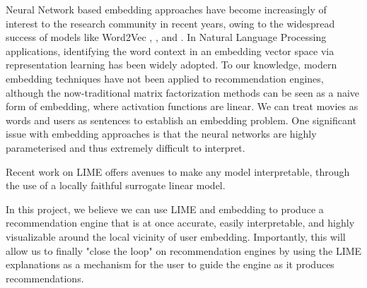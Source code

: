 Neural Network based embedding approaches have become increasingly of interest to the research community in recent years, owing to the widespread success of models like Word2Vec \cite{mikolov2013efficient}, \cite{rong2014word2vec}, and \cite{rong2014word2vec}. In Natural Language Processing applications, identifying the word context in an embedding vector space via representation learning has been widely adopted. To our knowledge, modern embedding techniques have not been applied to recommendation engines, although the now-traditional matrix factorization methods can be seen as a naive form of embedding, where activation functions are linear. We can treat movies as words and users as sentences to establish an embedding problem. One significant issue with embedding approaches is that the neural networks are highly parameterised and thus extremely difficult to interpret.

Recent work on LIME \cite{ribeiro2016model} \cite{ribeiro2016should} offers avenues to make any model interpretable, through the use of a locally faithful surrogate linear model. 

In this project, we believe we can use LIME and embedding to produce a recommendation engine that is at once accurate, easily interpretable, and highly visualizable around the local vicinity of user embedding. Importantly, this will allow us to finally "close the loop" on recommendation engines by using the LIME explanations as a mechanism for the user to guide the engine as it produces recommendations.
